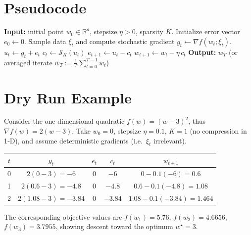 \documentclass{article}
\newcommand{\R}{\mathbb{R}}
\newcommand{\topk}[1]{\mathcal{S}_K\!\left(#1\right)}
\begin{document}
\section*{Pseudocode}
\begin{algorithm}[H]
\caption{Top‑$K$ Error‑Feedback SGD}
\begin{algorithmic}[1]
\State \textbf{Input:} initial point $w_0\in\R^d$, stepsize $\eta>0$, sparsity $K$.
\State Initialize error vector $e_0\gets 0$.
    \State Sample data $\xi_t$ and compute stochastic gradient $g_t\gets\nabla f(w_t;\xi_t)$.
    \State $u_t \gets g_t+e_t$ 
    \State $c_t \gets \topk{u_t}$ 
    \State $e_{t+1} \gets u_t-c_t$ 
    \State $w_{t+1} \gets w_t-\eta\,c_t$ 
\EndFor
\State \textbf{Output:} $w_T$ (or averaged iterate $\bar w_T:=\frac1T\sum_{t=0}^{T-1}w_t$)
\end{algorithmic}
\end{algorithm}

\section*{Dry Run Example}
Consider the one‑dimensional quadratic $f(w)=(w-3)^2$, thus $\nabla f(w)=2(w-3)$.  
Take $w_0=0$, stepsize $\eta=0.1$, $K=1$ (no compression in 1‑D), and assume deterministic gradients (i.e.\ $\xi_t$ irrelevant).

\begin{center}
\begin{tabular}{c|c|c|c|c}
$t$ & $g_t$ & $e_t$ & $c_t$ & $w_{t+1}$ \\ \hline
0 & $2(0-3)=-6$ & $0$ & $-6$ & $0-0.1(-6)=0.6$ \\
1 & $2(0.6-3)=-4.8$ & $0$ & $-4.8$ & $0.6-0.1(-4.8)=1.08$ \\
2 & $2(1.08-3)=-3.84$ & $0$ & $-3.84$ & $1.08-0.1(-3.84)=1.464$ \\
\end{tabular}
\end{center}
The corresponding objective values are $f(w_1)=5.76$, $f(w_2)=4.6656$, $f(w_3)=3.7955$, showing descent toward the optimum $w^\star=3$.

\newpage
\end{document}
